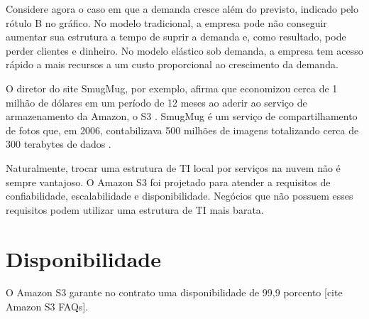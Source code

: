 Considere agora o caso em que a demanda cresce além do previsto, indicado pelo rótulo B no gráfico. No modelo tradicional, a empresa pode não conseguir aumentar sua estrutura a tempo de suprir a demanda e, como resultado, pode perder clientes e dinheiro. No modelo elástico sob demanda, a empresa tem acesso rápido a mais recursos a um custo proporcional ao crescimento da demanda.

O diretor do site SmugMug, por exemplo, afirma que economizou cerca de 1 milhão de dólares em um período de 12 meses ao aderir ao serviço de armazenamento da Amazon, o S3 \cite{http://blogs.smugmug.com/don/2006/11/10/amazon-s3-show-me-the-money/}. SmugMug é um serviço de compartilhamento de fotos que, em 2006, contabilizava 500 milhões de imagens totalizando cerca de 300 terabytes de dados \cite{http://blogs.smugmug.com/don/2006/08/12/amazon-s3-the-holy-grail/}.

Naturalmente, trocar uma estrutura de TI local por serviços na nuvem não é sempre vantajoso. O Amazon S3 foi projetado para atender a requisitos de confiabilidade, escalabilidade e disponibilidade. Negócios que não possuem esses requisitos podem utilizar uma estrutura de TI mais barata.

\section{Disponibilidade}
O Amazon S3 garante no contrato uma disponibilidade de 99,9 porcento [cite Amazon S3 FAQs].






